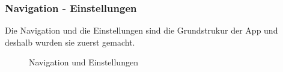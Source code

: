 \subsubsection{Navigation - Einstellungen}\label{mockup_navigation_settings}
Die Navigation und die Einstellungen sind die Grundstrukur der App und deshalb wurden sie zuerst gemacht.
\begin{figure}[ht]
\centering
{}
\label{fig:mockup_setting}
\caption{Navigation und Einstellungen}
\end{figure}

